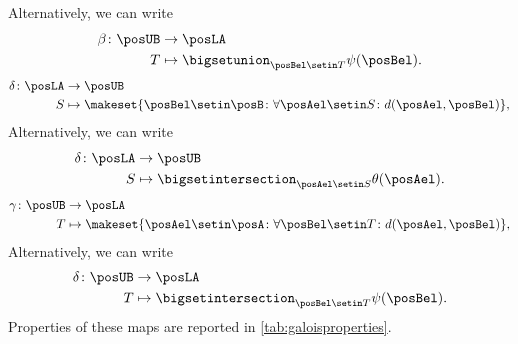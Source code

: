 {\begin{equation}
\end{equation}
%
\noindent Alternatively, we can write
\begin{equation}
    \begin{aligned}
        \beta \colon \posUB & \to \posLA \\
        T                   & \mapsto \bigsetunion_{\posBel\setin T} \psi(\posBel).
    \end{aligned}
\end{equation}
%
\begin{equation}
    \label{eq:galoisdelta}
    \begin{aligned}
        \delta \colon \posLA & \to \posUB \\
        S                    & \mapsto \makeset{\posBel\setin \posB \colon \forall {\posAel\setin S}\colon d(\posAel,\posBel)},
    \end{aligned}
\end{equation}
Alternatively, we can write
\begin{equation}
    \begin{aligned}
        \delta\colon \posLA & \to \posUB \\
        S                   & \mapsto \bigsetintersection_{\posAel\setin S}\theta(\posAel).
    \end{aligned}
\end{equation}
%
\begin{equation}
    \label{eq:galoisgamma}
    \begin{aligned}
        \gamma \colon \posUB & \to \posLA \\
        T                    & \mapsto \makeset{\posAel\setin \posA \colon \forall {\posBel\setin T}\colon d(\posAel,\posBel)},
    \end{aligned}
\end{equation}
Alternatively, we can write
\begin{equation}
    \begin{aligned}
        \delta\colon \posUB & \to \posLA \\
        T                   & \mapsto \bigsetintersection_{\posBel\setin T}\psi(\posBel).
    \end{aligned}
\end{equation}
%
Properties of these maps are reported in \cref{tab:galoisproperties}.

}
